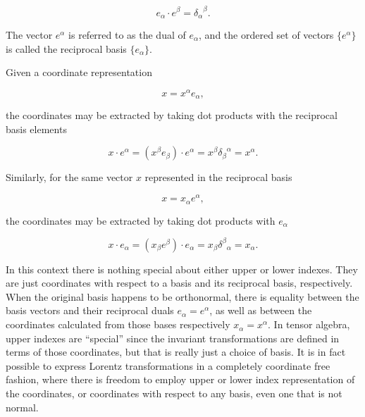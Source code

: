 \begin{equation}\label{eqn:grahamSchmidtLorentz:130}
e_\alpha \cdot e^\beta = {\delta_\alpha}^\beta.
\end{equation}

The vector $e^\alpha$ is referred to as the dual of $e_\alpha$, and the ordered set of vectors $\{e^\alpha\}$ is called the reciprocal basis $\{e_\alpha\}$.

Given a coordinate representation

\begin{equation}\label{eqn:grahamSchmidtLorentz:880}
x = x^\alpha e_\alpha,
\end{equation}

the coordinates may be extracted by taking dot products with the reciprocal basis elements

\begin{equation}\label{eqn:grahamSchmidtLorentz:340}
x \cdot e^\alpha = (x^\beta e_\beta) \cdot e^\alpha = x^\beta {\delta_\beta}^\alpha = x^\alpha.
\end{equation}

Similarly, for the same vector $x$ represented in the reciprocal basis

\begin{equation}\label{eqn:grahamSchmidtLorentz:900}
x = x_\alpha e^\alpha,
\end{equation}

the coordinates may be extracted by taking dot products with $e_\alpha$

\begin{equation}\label{eqn:grahamSchmidtLorentz:340b}
x \cdot e_\alpha = (x_\beta e^\beta) \cdot e_\alpha = x_\beta {\delta^\beta}_\alpha = x_\alpha.
\end{equation}

In this context there is nothing special about either upper or lower indexes.  They are just coordinates with respect to a basis and its reciprocal basis, respectively.  When the original basis happens to be orthonormal, there is equality between the basis vectors and their reciprocal duals $e_\alpha = e^\alpha$, as well as between the coordinates calculated from those bases respectively $x_\alpha = x^\alpha$.  In tensor algebra, upper indexes are ``special'' since the invariant transformations are defined in terms of those coordinates, but that is really just a choice of basis.  It is in fact possible \citep{doran2003gap} to express Lorentz transformations in a completely coordinate free fashion, where there is freedom to employ upper or lower index representation of the coordinates, or coordinates with respect to any basis, even one that is not normal.

